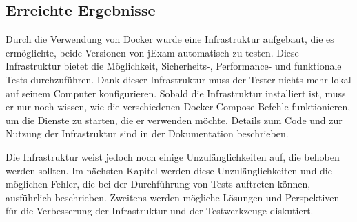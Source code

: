\subsection{Erreichte Ergebnisse}

Durch die Verwendung von Docker wurde eine Infrastruktur aufgebaut,
die es ermöglichte, beide Versionen von jExam automatisch zu testen.
Diese Infrastruktur bietet die Möglichkeit, Sicherheits-,
Performance- und funktionale Tests durchzuführen. Dank dieser
Infrastruktur muss der Tester nichts mehr lokal auf seinem
Computer konfigurieren. Sobald die Infrastruktur installiert
ist, muss er nur noch wissen, wie die verschiedenen
Docker-Compose-Befehle funktionieren, um die Dienste zu starten,
die er verwenden möchte. Details zum Code und zur Nutzung der
Infrastruktur sind in der Dokumentation beschrieben.

Die Infrastruktur weist jedoch noch einige Unzulänglichkeiten auf,
die behoben werden sollten. Im nächsten Kapitel werden diese
Unzulänglichkeiten und die möglichen Fehler, die bei der Durchführung
von Tests auftreten können, ausführlich beschrieben. Zweitens
werden mögliche Lösungen und Perspektiven für die Verbesserung der
Infrastruktur und der Testwerkzeuge diskutiert.
